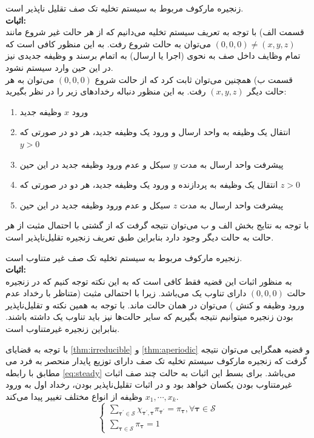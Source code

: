 \begin{thm}
\label{thm:irreducible}
زنجیره مارکوف مربوط به سیستم تخلیه تک صف تقلیل ناپذیر است. \\
\textbf{اثبات:} \\
قسمت الف) با توجه به تعریف سیستم تخلیه می‌دانیم که از هر حالت غیر شروع مانند \( (0, 0, 0) \neq (x, y, z)\) می‌توان به حالت شروع رفت. به این منظور کافی است که تمام وظایف داخل صف به نحوی (اجرا یا ارسال) به اتمام برسند و وظیفه جدیدی نیز در این حین وارد سیستم نشود. \\

قسمت ب) همچنین می‌توان ثابت کرد که از حالت شروع \((0, 0, 0)\) می‌توان به هر حالت دیگر \((x, y, z)\) رفت. به این منظور دنباله رخدادهای زیر را در نظر بگیرید:
\begin{enumerate}
	\item ورود \(x\) وظیفه جدید
	\item انتقال یک وظیفه به واحد ارسال و ورود یک وظیفه جدید، هر دو در صورتی که \(y > 0\)
	\item پیشرفت واحد ارسال به مدت \(y\) سیکل و عدم ورود وظیفه جدید در این حین
	\item انتقال یک وظیفه به پردازنده و ورود یک وظیفه جدید، هر دو در صورتی که \(z > 0\)
	\item پیشرفت واحد ارسال به مدت \(z\) سیکل و عدم ورود وظیفه جدید در این حین
\end{enumerate}
با توجه به نتایج بخش الف و ب می‌توان نتیجه گرفت که از گشتی با احتمال مثبت از هر حالت به حالت دیگر وجود دارد بنابراین طبق تعریف زنجیره تقلیل‌ناپذیر است.
\end{thm}
\begin{thm}
\label{thm:aperiodic}
زنجیره مارکوف مربوط به سیستم تخلیه تک صف غیر متناوب است. \\
\textbf{اثبات:} \\
به منظور اثبات این قضیه فقط کافی است که به این نکته توجه کنیم که در زنجیره حالت \((0, 0, 0)\) دارای تناوب یک می‌باشد. زیرا با احتمالی مثبت (متناظر با رخداد عدم ورود وظیفه و کنش ) می‌توان در همان حالت ماند. با توجه به همین نکته و تقلیل‌ناپذیر بودن زنجیره میتوانیم نتیجه بگیریم که سایر حالت‌ها نیز باید تناوب یک داشته باشند. بنابراین زنجیره غیرمتناوب است.
\end{thm}
با توجه به قضایای \ref{thm:irreducible} و \ref{thm:aperiodic} و قضیه همگرایی می‌توان نتیجه گرفت که زنجیره مارکوف سیستم تخلیه تک صف دارای توزیع پایدار منحصر به فرد می‌ مطابق با رابطه \ref{eq:steady} می‌باشد. برای بسط این اثبات به حالت چند صف اثبات غیرمتناوب بودن یکسان خواهد بود و در اثبات تقلیل‌ناپذیر بودن، رخداد اول به ورود \(x_1, \cdots, x_k\) وظیفه از انواع مختلف تغییر پیدا می‌کند.
\begin{equation}
	\label{eq:steady}
	\left\{\begin{array}{l}
		\sum_{\boldsymbol{\tau}^{\prime} \in \mathcal{S}} \chi_{\boldsymbol{\tau}^{\prime}, \boldsymbol{\tau}} \pi_{\boldsymbol{\tau}^{\prime}}=\pi_{\boldsymbol{\tau}}, \forall \boldsymbol{\tau} \in \mathcal{S} \\
		\sum_{\boldsymbol{\tau} \in \mathcal{S}} \pi_{\boldsymbol{\tau}}=1
	\end{array}\right.
\end{equation}
